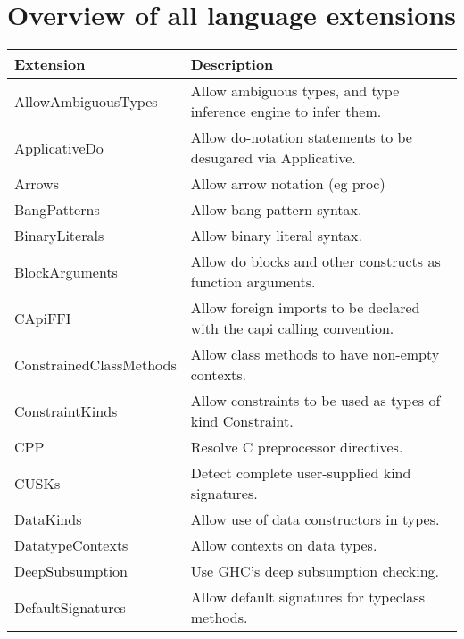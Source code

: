 \documentclass[openany, 12pt]{book}
\begin{document}
\chapter{Overview of all language extensions}
\begin{center}
	\begin{supertabular}{ll}
		\toprule
		Extension                  & Description                                                                \\
		\midrule
		AllowAmbiguousTypes        & Allow ambiguous types, and type inference engine to infer them.            \\
		ApplicativeDo              & Allow do-notation statements to be desugared via Applicative.              \\
		Arrows                     & Allow arrow notation (eg proc)                                             \\
		BangPatterns               & Allow bang pattern syntax.                                                 \\
		BinaryLiterals             & Allow binary literal syntax.                                               \\
		BlockArguments             & Allow do blocks and other constructs as function arguments.                \\
		CApiFFI                    & Allow foreign imports to be declared with the capi calling convention.     \\
		ConstrainedClassMethods    & Allow class methods to have non-empty contexts.                            \\
		ConstraintKinds            & Allow constraints to be used as types of kind Constraint.                  \\
		CPP                        & Resolve C preprocessor directives.                                         \\
		CUSKs                      & Detect complete user-supplied kind signatures.                             \\
		DataKinds                  & Allow use of data constructors in types.                                   \\
		DatatypeContexts           & Allow contexts on data types.                                              \\
		DeepSubsumption            & Use GHC's deep subsumption checking.                                       \\
		DefaultSignatures          & Allow default signatures for typeclass methods.                            \\

\end{supertabular}
\end{center}
\end{document}
